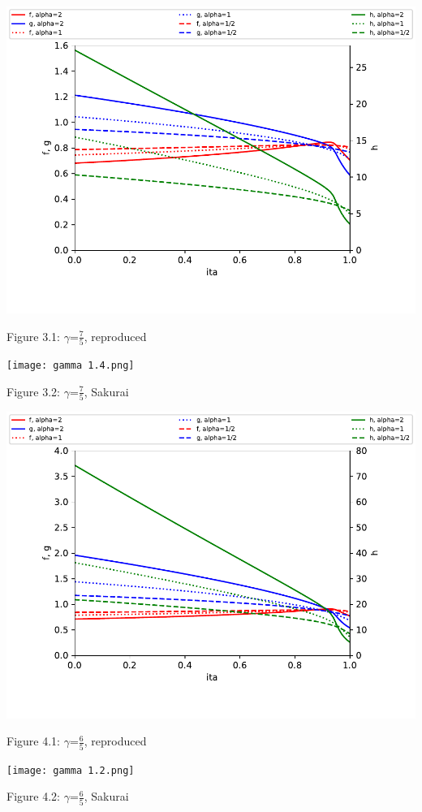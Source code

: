 \documentclass{article}
\begin{document}
\newpage
\centerline{\includegraphics[scale=0.7]{gamma 1.4.pdf}}
\centerline{Figure 3.1: $\gamma$=$\frac{7}{5}$, reproduced}
\centerline{\texttt{[image: gamma 1.4.png]}}
\centerline{Figure 3.2: $\gamma$=$\frac{7}{5}$, Sakurai}

\newpage
\centerline{\includegraphics[scale=0.7]{gamma 1.2.pdf}}
\centerline{Figure 4.1: $\gamma$=$\frac{6}{5}$, reproduced}
\centerline{\texttt{[image: gamma 1.2.png]}}
\centerline{Figure 4.2: $\gamma$=$\frac{6}{5}$, Sakurai}

\newpage
\end{document}
